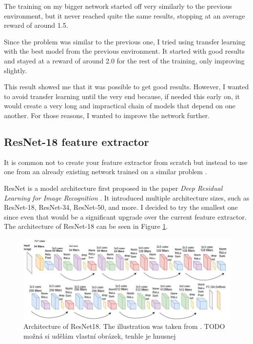 \documentclass[
  digital,     %
  oneside,     %
  nosansbold,  %
  nocolorbold, %
  lof,         %
  lot,         %
]{fithesis4}
\begin{document}
The training on my bigger network started off very similarly to the previous environment, but it never reached quite the same results, stopping at an average reward of around 1.5.

Since the problem was similar to the previous one, I tried using transfer learning with the best model from the previous environment. It started with good results and stayed at a reward of around 2.0 for the rest of the training, only improving slightly.

This result showed me that it was possible to get good results. However, I wanted to avoid transfer learning until the very end because, if needed this early on, it would create a very long and impractical chain of models that depend on one another. For those reasons, I wanted to improve the network further.

\subsection{ResNet-18 feature extractor}
\label{subsec:resnet}

It is common not to create your feature extractor from scratch but instead to use one from an already existing network trained on a similar problem \cite[p. 256]{DLforVisualSystems}.

ResNet is a model architecture first proposed in the paper \textit{Deep Residual Learning for Image Recognition} \cite{ResNet18}. It introduced multiple architecture sizes, such as ResNet-18, ResNet-34, ResNet-50, and more. I decided to try the smallest one since even that would be a significant upgrade over the current feature extractor. The architecture of ResNet-18 can be seen in Figure \ref{fig:resnet}.

\begin{figure}
    \centering
    \includegraphics[width=1\linewidth]{diagrams/resnet.png}
    \caption{Architecture of ResNet18. The illustration was taken from \cite{resnet_illustration}. TODO možná si udělám vlastní obrázek, tenhle je hnusnej}
    \label{fig:resnet}
\end{figure}
\end{document}
